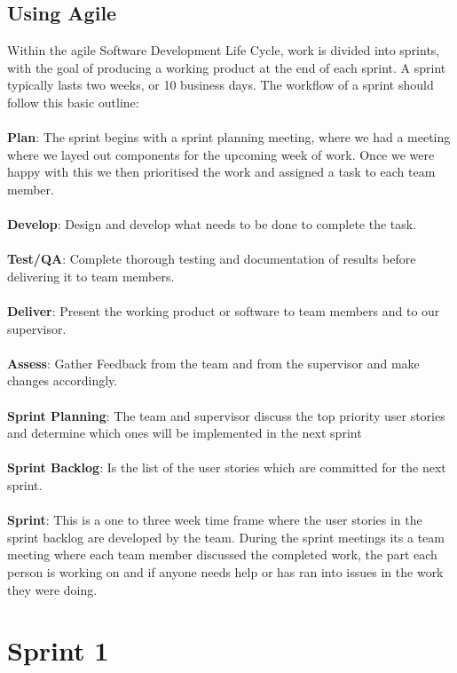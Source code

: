 \subsection{Using Agile} 
Within the agile Software Development Life Cycle, work is divided into sprints, with the goal of producing a working product at the end of each sprint. A sprint typically lasts two weeks, or 10 business days. The workflow of a sprint should follow this basic outline:
\\
\\
\textbf{Plan}: The sprint begins with a sprint planning meeting, where we had a meeting where we layed out components for the upcoming week of work. Once we were happy with this we then prioritised the work and assigned a task to each team member.
\\
\\
\textbf{Develop}: Design and develop what needs to be done to complete the task.
\\
\\
\textbf{Test/QA}: Complete thorough testing and documentation of results before delivering it to team members.
\\
\\
\textbf{Deliver}: Present the working product or software to team members and to our supervisor.
\\
\\
\textbf{Assess}: Gather Feedback from the team and from the supervisor and make changes accordingly.
\\
\\
\textbf{Sprint Planning}:
The team and supervisor discuss the top priority user stories and determine which ones will be implemented in the next sprint
\\
\\
\textbf{Sprint Backlog}: Is the list of the user stories which are committed for the next sprint.
\\
\\
\textbf{Sprint}:
This is a one to three week time frame where the user stories in the sprint backlog are developed by the team. During the sprint meetings its a team meeting where each team member discussed the completed work, the part each person is working on and if anyone needs help or has ran into issues in the work they were doing.
\\

\section{Sprint 1}
